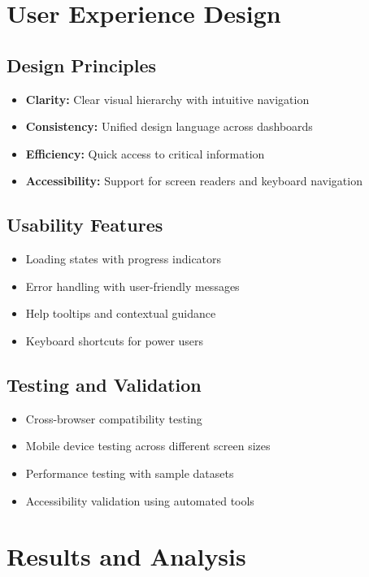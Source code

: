 \documentclass[12pt,a4paper]{article}
\begin{document}
\section{User Experience Design}

\subsection{Design Principles}
\begin{itemize}
    \item \textbf{Clarity:} Clear visual hierarchy with intuitive navigation
    \item \textbf{Consistency:} Unified design language across dashboards
    \item \textbf{Efficiency:} Quick access to critical information
    \item \textbf{Accessibility:} Support for screen readers and keyboard navigation
\end{itemize}

\subsection{Usability Features}
\begin{itemize}
    \item Loading states with progress indicators
    \item Error handling with user-friendly messages
    \item Help tooltips and contextual guidance
    \item Keyboard shortcuts for power users
\end{itemize}

\subsection{Testing and Validation}
\begin{itemize}
    \item Cross-browser compatibility testing
    \item Mobile device testing across different screen sizes
    \item Performance testing with sample datasets
    \item Accessibility validation using automated tools
\end{itemize}

\section{Results and Analysis}
\end{document}
